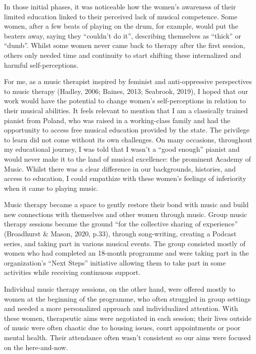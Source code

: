 \documentclass[authordate, empirical, issue]{jote-new-article}
\begin{document}
In those initial phases, it was noticeable how the women's awareness of their limited education linked to their perceived lack of musical competence. Some women, after a few beats of playing on the drum, for example, would put the beaters away, saying they “couldn't do it”, describing themselves as “thick” or “dumb”. Whilst some women never came back to therapy after the first session, others only needed time and continuity to start shifting these internalized and harmful self-perceptions.







For me, as a music therapist inspired by feminist and anti-oppressive perspectives to music therapy (Hadley, 2006; Baines, 2013; Seabrook, 2019), I hoped that our work would have the potential to change women's self-perceptions in relation to their musical abilities. It feels relevant to mention that I am a classically trained pianist from Poland, who was raised in a working-class family and had the opportunity to access free musical education provided by the state. The privilege to learn did not come without its own challenges. On many occasions, throughout my educational journey, I was told that I wasn't a “good enough” pianist and would never make it to the land of musical excellence: the prominent Academy of Music. Whilst there was a clear difference in our backgrounds, histories, and access to education, I could empathize with these women's feelings of inferiority when it came to playing music.







Music therapy became a space to gently restore their bond with music and build new connections with themselves and other women through music. Group music therapy sessions became the ground “for the collective sharing of experience” (Broadhurst \& Mason, 2020, p.33), through song-writing, creating a Podcast series, and taking part in various musical events. The group consisted mostly of women who had completed an 18-month programme and were taking part in the organization's “Next Steps” initiative allowing them to take part in some activities while receiving continuous support.



Individual music therapy sessions, on the other hand, were offered mostly to women at the beginning of the programme, who often struggled in group settings and needed a more personalized approach and individualized attention. With these women, therapeutic aims were negotiated in each session; their lives outside of music were often chaotic due to housing issues, court appointments or poor mental health. Their attendance often wasn't consistent so our aims were focused on the here-and-now.
\end{document}
